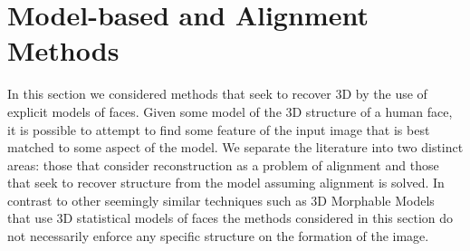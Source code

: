 \section{Model-based and Alignment Methods}\label{sec:bg_model_based}
In this section we considered methods that seek to recover 3D by the use
of explicit models of faces. Given some model of the 3D structure of a human
face, it is possible to attempt to find some feature of the input image
that is best matched to some aspect of the model. We separate the literature
into two distinct areas: those that consider reconstruction as a problem of
alignment and those that seek to recover structure from the model assuming
alignment is solved. In contrast to other seemingly similar techniques such as
3D Morphable Models~\cite{volker1999morphable} that use 3D statistical models
of faces the methods considered in this section do not necessarily enforce any
specific structure on the formation of the image.
